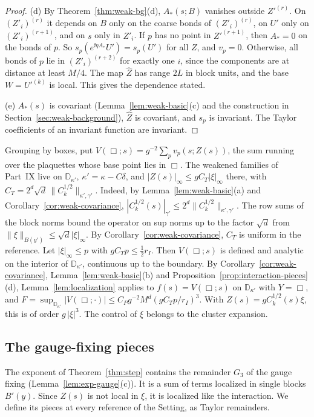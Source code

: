 \begin{proof}
(d) By Theorem~\ref{thm:weak-bg}(d), $A_*(s;B)$ vanishes outside $Z'^{(r)}$. On $(Z'_i)^{(r)}$ it depends on $B$ only on the coarse bonds of $(Z'_i)^{(r)}$, on $U'$ only on $(Z'_i)^{(r+1)}$, and on $s$ only in $Z'_i$. If $p$ has no point in $Z'^{(r+1)}$, then $A_*=0$ on the bonds of $p$. So $s_p(e^{\ii\eta A_*}U')=s_p(U')$ for all $Z$, and $v_p=0$. Otherwise, all bonds of $p$ lie in $(Z'_i)^{(r+2)}$ for exactly one $i$, since the components are at distance at least $M/4$. The map $\hat Z$ has range $2L$ in block units, and the base $W=U'^{(k)}$ is local. This gives the dependence stated.

(e) $A_*(s)$ is covariant (Lemma~\ref{lem:weak-basic}(c) and the construction in Section~\ref{sec:weak-background}), $\hat Z$ is covariant, and $s_p$ is invariant. The Taylor coefficients of an invariant function are invariant.
\end{proof}

Grouping by boxes, put $V(\Box;s)=g^{-2}\sum_{p}v_p(s;Z(s))$, the sum running over the plaquettes whose base point lies in $\Box$. The weakened families of Part~IX live on $\mathbb D_{\kappa'}$, $\kappa'=\kappa-C\delta$, and $|Z(s)|_\infty\le gC_T|\xi|_\infty$ there, with $C_T=2^d\sqrt d\,\|C_k^{1/2}\|_{\kappa',\gamma'}$. Indeed, by Lemma~\ref{lem:weak-basic}(a) and Corollary~\ref{cor:weak-covariance}, $|C_k^{1/2}(s)|_{\gamma'}\le2^d\|C_k^{1/2}\|_{\kappa',\gamma'}$. The row sums of the block norms bound the operator on sup norms up to the factor $\sqrt d$ from $\|\xi\|_{B(y')}\le\sqrt d|\xi|_\infty$. By Corollary~\ref{cor:weak-covariance}, $C_T$ is uniform in the reference. Let $|\xi|_\infty\le p$ with $gC_Tp\le\frac12r_I$. Then $V(\Box;s)$ is defined and analytic on the interior of $\mathbb D_{\kappa'}$, continuous up to the boundary. By Corollary~\ref{cor:weak-covariance}, Lemma~\ref{lem:weak-basic}(b) and Proposition~\ref{prop:interaction-pieces}(d), Lemma~\ref{lem:localization} applies to $f(s)=V(\Box;s)$ on $\mathbb D_{\kappa'}$ with $Y=\Box$, and $F=\sup_{\mathbb D_{\kappa'}}|V(\Box;\cdot)|\le C_Pg^{-2}M^d(gC_Tp/r_I)^3$. With $Z(s)=gC_k^{1/2}(s)\xi$, this is of order $g\,|\xi|^3$. The control of $\xi$ belongs to the cluster expansion.

\subsection{The gauge-fixing pieces}\label{subsec:sq-gf}

The exponent of Theorem~\ref{thm:step} contains the remainder $G_3$ of the gauge fixing (Lemma~\ref{lem:exp-gauge}(c)). It is a sum of terms localized in single blocks $B'(y)$. Since $Z(s)$ is not local in $\xi$, it is localized like the interaction. We define its pieces at every reference of the Setting, as Taylor remainders.

